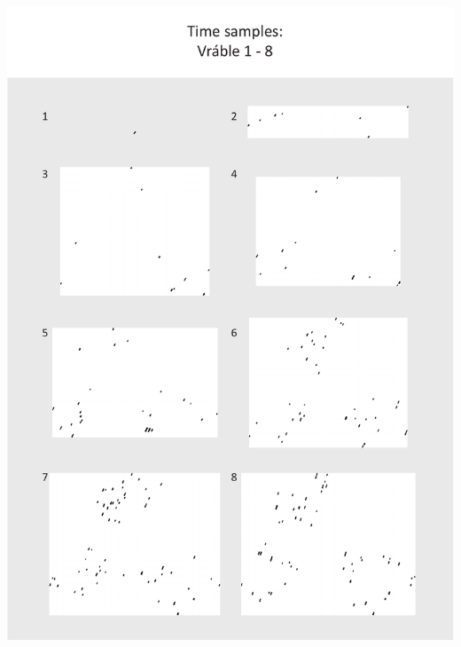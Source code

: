 \documentclass[
  12pt,
  a4paper, twoside]{book}
\begin{document}
\begin{center}\includegraphics[width=1\linewidth]{Appendix/time_1} \end{center}

\newpage
\end{document}
